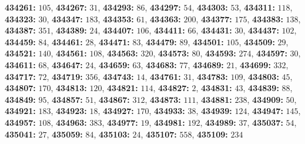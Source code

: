 \textsf{\bfseries 434261:} $105$, \textsf{\bfseries 434267:} $31$, \textsf{\bfseries 434293:} $86$, \textsf{\bfseries 434297:} $54$, \textsf{\bfseries 434303:} $53$, \textsf{\bfseries 434311:} $118$, \textsf{\bfseries 434323:} $30$, \textsf{\bfseries 434347:} $183$, \textsf{\bfseries 434353:} $61$, \textsf{\bfseries 434363:} $200$, \textsf{\bfseries 434377:} $175$, \textsf{\bfseries 434383:} $138$, \textsf{\bfseries 434387:} $351$, \textsf{\bfseries 434389:} $24$, \textsf{\bfseries 434407:} $106$, \textsf{\bfseries 434411:} $66$, \textsf{\bfseries 434431:} $30$, \textsf{\bfseries 434437:} $102$, \textsf{\bfseries 434459:} $84$, \textsf{\bfseries 434461:} $28$, \textsf{\bfseries 434471:} $83$, \textsf{\bfseries 434479:} $89$, \textsf{\bfseries 434501:} $105$, \textsf{\bfseries 434509:} $29$, \textsf{\bfseries 434521:} $140$, \textsf{\bfseries 434561:} $108$, \textsf{\bfseries 434563:} $320$, \textsf{\bfseries 434573:} $80$, \textsf{\bfseries 434593:} $274$, \textsf{\bfseries 434597:} $30$, \textsf{\bfseries 434611:} $68$, \textsf{\bfseries 434647:} $24$, \textsf{\bfseries 434659:} $63$, \textsf{\bfseries 434683:} $77$, \textsf{\bfseries 434689:} $21$, \textsf{\bfseries 434699:} $332$, \textsf{\bfseries 434717:} $72$, \textsf{\bfseries 434719:} $356$, \textsf{\bfseries 434743:} $14$, \textsf{\bfseries 434761:} $31$, \textsf{\bfseries 434783:} $109$, \textsf{\bfseries 434803:} $45$, \textsf{\bfseries 434807:} $170$, \textsf{\bfseries 434813:} $120$, \textsf{\bfseries 434821:} $114$, \textsf{\bfseries 434827:} $2$, \textsf{\bfseries 434831:} $43$, \textsf{\bfseries 434839:} $88$, \textsf{\bfseries 434849:} $95$, \textsf{\bfseries 434857:} $51$, \textsf{\bfseries 434867:} $312$, \textsf{\bfseries 434873:} $111$, \textsf{\bfseries 434881:} $238$, \textsf{\bfseries 434909:} $50$, \textsf{\bfseries 434921:} $183$, \textsf{\bfseries 434923:} $18$, \textsf{\bfseries 434927:} $170$, \textsf{\bfseries 434933:} $38$, \textsf{\bfseries 434939:} $124$, \textsf{\bfseries 434947:} $145$, \textsf{\bfseries 434957:} $108$, \textsf{\bfseries 434963:} $383$, \textsf{\bfseries 434977:} $19$, \textsf{\bfseries 434981:} $192$, \textsf{\bfseries 434989:} $37$, \textsf{\bfseries 435037:} $54$, \textsf{\bfseries 435041:} $27$, \textsf{\bfseries 435059:} $84$, \textsf{\bfseries 435103:} $24$, \textsf{\bfseries 435107:} $558$, \textsf{\bfseries 435109:} $234$